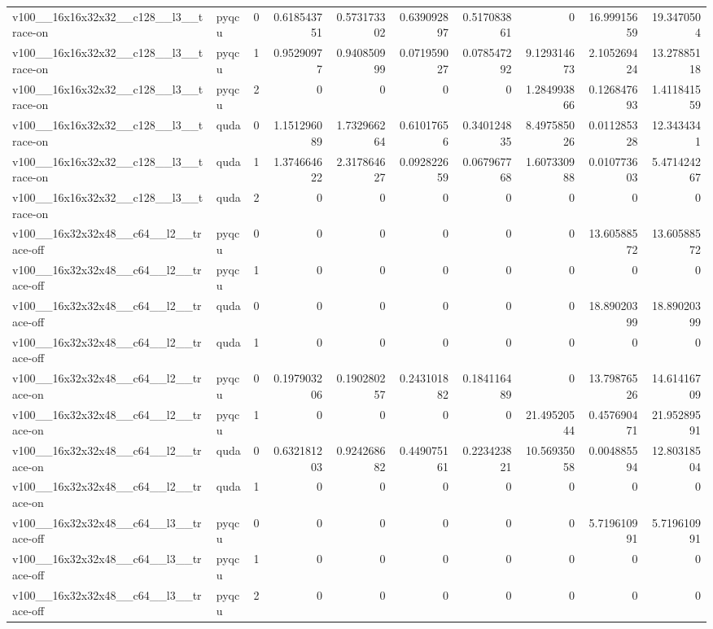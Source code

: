 \begin{table}[htbp]
\begin{tabular}{@{}llrrrrrrrr@{}}
v100\_\_16x16x32x32\_\_c128\_\_l3\_\_trace-on & pyqcu & 0 & 0.618543751 & 0.573173302 & 0.639092897 & 0.517083861 & 0 & 16.99915659 & 19.3470504 \\
v100\_\_16x16x32x32\_\_c128\_\_l3\_\_trace-on & pyqcu & 1 & 0.95290977 & 0.940850999 & 0.071959027 & 0.078547292 & 9.129314673 & 2.105269424 & 13.27885118 \\
v100\_\_16x16x32x32\_\_c128\_\_l3\_\_trace-on & pyqcu & 2 & 0 & 0 & 0 & 0 & 1.284993866 & 0.126847693 & 1.411841559 \\
v100\_\_16x16x32x32\_\_c128\_\_l3\_\_trace-on & quda & 0 & 1.151296089 & 1.732966264 & 0.61017656 & 0.340124835 & 8.497585026 & 0.011285328 & 12.3434341 \\
v100\_\_16x16x32x32\_\_c128\_\_l3\_\_trace-on & quda & 1 & 1.374664622 & 2.317864627 & 0.092822659 & 0.067967768 & 1.607330988 & 0.010773603 & 5.471424267 \\
v100\_\_16x16x32x32\_\_c128\_\_l3\_\_trace-on & quda & 2 & 0 & 0 & 0 & 0 & 0 & 0 & 0 \\
v100\_\_16x32x32x48\_\_c64\_\_l2\_\_trace-off & pyqcu & 0 & 0 & 0 & 0 & 0 & 0 & 13.60588572 & 13.60588572 \\
v100\_\_16x32x32x48\_\_c64\_\_l2\_\_trace-off & pyqcu & 1 & 0 & 0 & 0 & 0 & 0 & 0 & 0 \\
v100\_\_16x32x32x48\_\_c64\_\_l2\_\_trace-off & quda & 0 & 0 & 0 & 0 & 0 & 0 & 18.89020399 & 18.89020399 \\
v100\_\_16x32x32x48\_\_c64\_\_l2\_\_trace-off & quda & 1 & 0 & 0 & 0 & 0 & 0 & 0 & 0 \\
v100\_\_16x32x32x48\_\_c64\_\_l2\_\_trace-on & pyqcu & 0 & 0.197903206 & 0.190280257 & 0.243101882 & 0.184116489 & 0 & 13.79876526 & 14.61416709 \\
v100\_\_16x32x32x48\_\_c64\_\_l2\_\_trace-on & pyqcu & 1 & 0 & 0 & 0 & 0 & 21.49520544 & 0.457690471 & 21.95289591 \\
v100\_\_16x32x32x48\_\_c64\_\_l2\_\_trace-on & quda & 0 & 0.632181203 & 0.924268682 & 0.449075161 & 0.223423821 & 10.56935058 & 0.004885594 & 12.80318504 \\
v100\_\_16x32x32x48\_\_c64\_\_l2\_\_trace-on & quda & 1 & 0 & 0 & 0 & 0 & 0 & 0 & 0 \\
v100\_\_16x32x32x48\_\_c64\_\_l3\_\_trace-off & pyqcu & 0 & 0 & 0 & 0 & 0 & 0 & 5.719610991 & 5.719610991 \\
v100\_\_16x32x32x48\_\_c64\_\_l3\_\_trace-off & pyqcu & 1 & 0 & 0 & 0 & 0 & 0 & 0 & 0 \\
v100\_\_16x32x32x48\_\_c64\_\_l3\_\_trace-off & pyqcu & 2 & 0 & 0 & 0 & 0 & 0 & 0 & 0 \\

\end{tabular}
\end{table}
